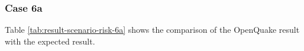 \subsubsection{Case 6a}




Table \ref{tab:result-scenario-risk-6a} shows the comparison of the OpenQuake result with the expected result.

